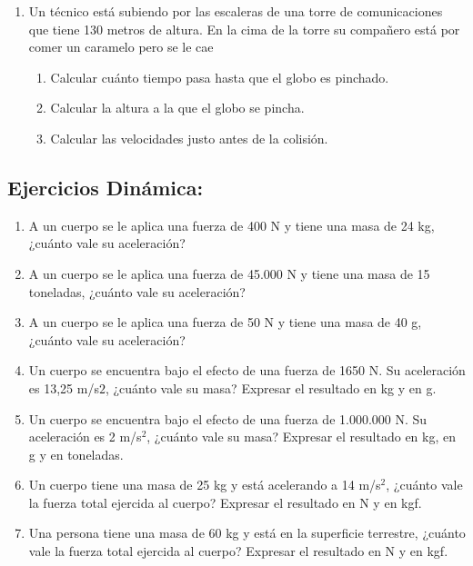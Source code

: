 \begin{enumerate}
\item Un técnico está subiendo por las escaleras de una torre de comunicaciones que tiene 130 metros de altura. En la cima de la torre su compañero está por comer un caramelo pero se le cae
\begin{enumerate}
    \item Calcular cuánto tiempo pasa hasta que el
    globo es pinchado.
    \item Calcular la altura a la que el globo se pincha.
    \item Calcular las velocidades justo antes de la colisión.
\end{enumerate}
\end{enumerate}

\subsection*{Ejercicios Dinámica:}

\begin{enumerate}
\item A un cuerpo se le aplica una fuerza de 400 N y tiene una masa de 24 kg, ¿cuánto vale su aceleración?

\item A un cuerpo se le aplica una fuerza de 45.000 N y tiene una masa de 15 toneladas, ¿cuánto vale su aceleración?

\item A un cuerpo se le aplica una fuerza de 50 N y tiene una masa de 40 g, ¿cuánto vale su aceleración?

\item Un cuerpo se encuentra bajo el efecto de una fuerza de 1650 N. Su aceleración es 13,25 m/s$2$, ¿cuánto vale su masa? Expresar el resultado en kg y en g. %

\item Un cuerpo se encuentra bajo el efecto de una fuerza de 1.000.000 N. Su aceleración es 2 m/s$^2$, ¿cuánto vale su masa? Expresar el resultado en kg, en g y en toneladas. %

\item Un cuerpo tiene una masa de 25 kg y está acelerando a 14 m/s$^2$, ¿cuánto vale la fuerza total ejercida al cuerpo? Expresar el resultado en N y en kgf. %


\item Una persona tiene una masa de 60 kg y está en la superficie terrestre, ¿cuánto vale la fuerza total ejercida al cuerpo? Expresar el resultado en N y en kgf. %

\end{enumerate}



